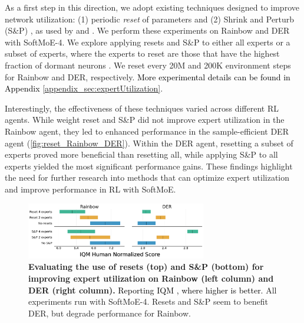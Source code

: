 \documentclass{article} %
\newcommand{\rebuttal}[1]{\textcolor{black}{#1}}
\begin{document}
As a first step in this direction, we adopt existing techniques designed to improve network utilization: (1) periodic \textit{reset} of parameters \citep{nikishin2022primacy} and (2) Shrink and Perturb (S\&P) \citep{ash2020warm}, as used by \citet{d'oro2022sampleefficient} and \citet{schwarzer23bbf}. We perform these experiments on Rainbow and DER with SoftMoE-4. We explore applying resets and S\&P to either all experts or a subset of experts, where the experts to reset are those that have the highest fraction of dormant neurons \citep{sokar2023dormant}. We reset every 20M and 200K environment steps for Rainbow and DER, respectively. \rebuttal{More experimental details can be found in Appendix \ref{appendix_sec:expertUtilization}}.

Interestingly, the effectiveness of these techniques varied across different RL agents.  While weight reset and S\&P did not improve expert utilization in the Rainbow agent, they led to enhanced performance in the sample-efficient DER agent (\autoref{fig:reset_Rainbow_DER}). Within the DER agent, resetting a subset of experts proved more beneficial than resetting all, while applying S\&P to all experts yielded the most significant performance gains. These findings highlight the need for further research into methods that can optimize expert utilization and improve performance in RL with SoftMoE.

\begin{figure}[!t]
    \centering
    \includegraphics[width=0.7\textwidth]{figures/results/resetAggregate_IntEstimates.pdf}
    \caption{{\bf Evaluating the use of resets (top) and S\&P (bottom) for improving expert utilization on Rainbow (left column) and DER (right column).} \rebuttal{Reporting IQM \citep{agarwal2021deep}, where higher is better.} All experiments run with SoftMoE-4. Resets and S\&P seem to benefit DER, but degrade performance for Rainbow.}
    \label{fig:reset_Rainbow_DER}
\end{figure}


\end{document}
